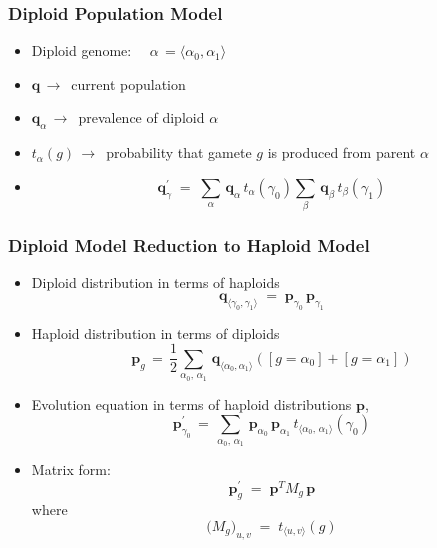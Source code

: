 \documentclass[aspectratio=169]{beamer}
\begin{document}
  \begin{frame}
    \frametitle{Diploid Population Model}
    \begin{itemize}
      \item{Diploid genome: $\quad \alpha \,= \langle \alpha_0, \alpha_1 \rangle$}
      \item{$\bm{q} \, \to \,$ current population} 
      \item{$\bm{q}_\alpha \, \to \,$ prevalence of diploid $\alpha$}
      \item{$t_\alpha(g) \, \to\,$ probability that gamete $g$ is produced from parent $\alpha$ }
      \item{\[\bm{q}_\gamma^{\prime} \; = \;
      \sum_{\alpha} \, \bm{q}_\alpha \, t_\alpha(\gamma_0) 
      \sum_{\beta} \,\bm{q}_\beta \, t_\beta(\gamma_1)\]}
    \end{itemize}
  \end{frame}
  
  \begin{frame}
    \frametitle{Diploid Model Reduction to Haploid Model}
    \begin{itemize}
      \item{Diploid distribution in terms of haploids
      \[\bm{q}_{\langle \gamma_0, \gamma_1 \rangle}\; = \;
      \bm{p}_{\gamma_0} \, \bm{p}_{\gamma_1}\]}
      \item{Haploid distribution in terms of diploids
      \[ \bm{p}_g \, = \, \frac{1}{2} \sum_{\alpha_0, \, \alpha_1} \, \bm{q}_{\langle \alpha_0, \alpha_1 \rangle}
	    ([g = \alpha_0] + [g = \alpha_1]) \]}
      \item{Evolution equation in terms of haploid distributions $\bm{p}$,
      \[\bm{p}_{\gamma_0}^{\prime} \,=\, \sum_{\alpha_0, \, \alpha_1} \, \bm{p}_{\alpha_0} \, \bm{p}_{\alpha_1} \,
	  t_{\langle \alpha_0, \,\alpha_1 \rangle}(\gamma_0) \]}
      \item{Matrix form:
      \[ \bm{p}_g^\prime \; = \; \bm{p}^T M_g \, \bm{p} \] where \[ \Big(M_g \Big)_{u,v} \; = \; t_{\langle u, v \rangle}(g) \]}
    \end{itemize}
  \end{frame}
  
\end{document}
